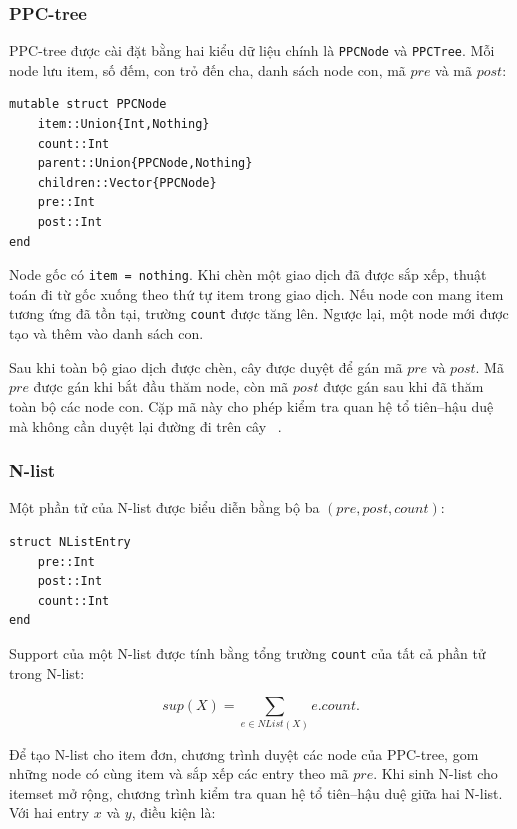 \subsubsection{PPC-tree}

PPC-tree được cài đặt bằng hai kiểu dữ liệu chính là \texttt{PPCNode} và \texttt{PPCTree}. Mỗi node lưu item, số đếm, con trỏ đến cha, danh sách node con, mã $pre$ và mã $post$:

\begin{lstlisting}[caption={Cấu trúc node trong PPC-tree}, label={lst:ppc-node}]
mutable struct PPCNode
    item::Union{Int,Nothing}
    count::Int
    parent::Union{PPCNode,Nothing}
    children::Vector{PPCNode}
    pre::Int
    post::Int
end
\end{lstlisting}

Node gốc có \texttt{item = nothing}. Khi chèn một giao dịch đã được sắp xếp, thuật toán đi từ gốc xuống theo thứ tự item trong giao dịch. Nếu node con mang item tương ứng đã tồn tại, trường \texttt{count} được tăng lên. Ngược lại, một node mới được tạo và thêm vào danh sách con.

Sau khi toàn bộ giao dịch được chèn, cây được duyệt để gán mã $pre$ và
$post$. Mã $pre$ được gán khi bắt đầu thăm node, còn mã $post$ được gán sau khi
đã thăm toàn bộ các node con. Cặp mã này cho phép kiểm tra quan hệ tổ
tiên--hậu duệ mà không cần duyệt lại đường đi trên cây
~\cite{deng2012prepost}.

\subsubsection{N-list}

Một phần tử của N-list được biểu diễn bằng bộ ba $(pre, post, count)$:

\begin{lstlisting}[caption={Biểu diễn phần tử N-list}, label={lst:nlist-entry}]
struct NListEntry
    pre::Int
    post::Int
    count::Int
end
\end{lstlisting}

Support của một N-list được tính bằng tổng trường \texttt{count} của tất cả phần tử trong N-list:

\begin{equation}
    sup(X) = \sum_{e \in NList(X)} e.count.
    \label{eq:implementation-nlist-support}
\end{equation}

Để tạo N-list cho item đơn, chương trình duyệt các node của PPC-tree,
gom những node có cùng item và sắp xếp các entry theo mã $pre$. Khi sinh N-list
cho itemset mở rộng, chương trình kiểm tra quan hệ tổ tiên--hậu duệ giữa hai
N-list. Với hai entry $x$ và $y$, điều kiện là:


